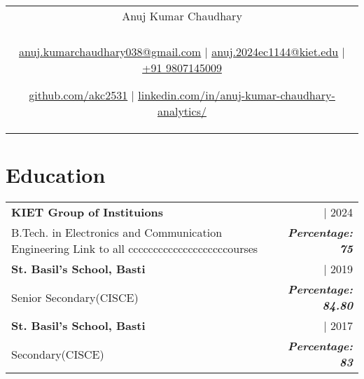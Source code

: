 \documentclass[a4paper,8pt]{article}
\begin{document}
\pagestyle{empty} 


\begin{tabularx}{\linewidth}{@{} C @{}}
\color[HTML]{1C033C} \Huge{Anuj Kumar Chaudhary} \\[6pt]
\\
\textcolor[HTML]{371e77}{\underline{\href{mailto:anuj.kumarchaudhary038@gmail.com}{\raisebox{-0.05\height}{\faEnvelope} anuj.kumarchaudhary038@gmail.com}} $|$}
\textcolor[HTML]{371e77}{\underline{\href{mailto:anuj.2024ec1144@kiet.edu}{\raisebox{-0.05\height}{\faEnvelope} anuj.2024ec1144@kiet.edu}} $|$}
\textcolor[HTML]{371e77}{\href{tel:+919807145009}{\raisebox{-0.05\height}{\faMobile} +91 9807145009}}

\textcolor[HTML]{371e77}{\underline{\href{https://github.com/akc2531}{\raisebox{-0.05\height}{\faGithub} github.com/akc2531}} $|$}
\textcolor[HTML]{371e77}{\underline{\href{https://www.linkedin.com/in/anuj-kumar-chaudhary-analytics/}{\raisebox{-0.05\height}{\faLinkedin} linkedin.com/in/anuj-kumar-chaudhary-analytics/}}}
\end{tabularx}

\section{Education}
\begin{tabularx}{\linewidth}{ @{}l r@{} }
\color[HTML]{1C033C} \textbf{KIET Group of Instituions} & \hfill \color[HTML]{371e77} | 2024 \\
\color[HTML]{371e77} B.Tech. in Electronics and Communication Engineering {{{}{Link to all ccccccccccccccccccccourses}}} & \hfill \color[HTML]{4B28A4} \textit{\textbf{Percentage: 75}} \\
\color[HTML]{1C033C} \textbf{St. Basil's School, Basti} & \hfill \color[HTML]{371e77} | 2019 \\
\color[HTML]{371e77} Senior Secondary(CISCE)  & \hfill \color[HTML]{4B28A4} \textit{\textbf{Percentage: 84.80}} \\
\color[HTML]{1C033C} \textbf{St. Basil's School, Basti} & \hfill \color[HTML]{371e77} | 2017 \\
\color[HTML]{371e77} Secondary(CISCE)  & \hfill \color[HTML]{4B28A4} \textit{\textbf{Percentage: 83}} \\
\end{tabularx}


\end{document}
